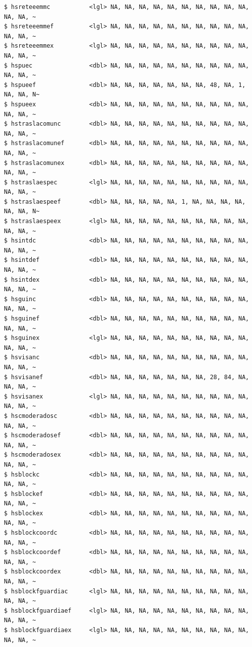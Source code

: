 \documentclass[
  letterpaper,
  DIV=11,
  numbers=noendperiod]{scrreprt}
\begin{document}
\begin{verbatim}
$ hsreteeemmc           <lgl> NA, NA, NA, NA, NA, NA, NA, NA, NA, NA, NA, NA, ~
$ hsreteeemmef          <lgl> NA, NA, NA, NA, NA, NA, NA, NA, NA, NA, NA, NA, ~
$ hsreteeemmex          <lgl> NA, NA, NA, NA, NA, NA, NA, NA, NA, NA, NA, NA, ~
$ hspuec                <dbl> NA, NA, NA, NA, NA, NA, NA, NA, NA, NA, NA, NA, ~
$ hspueef               <dbl> NA, NA, NA, NA, NA, NA, NA, 48, NA, 1, NA, NA, N~
$ hspueex               <dbl> NA, NA, NA, NA, NA, NA, NA, NA, NA, NA, NA, NA, ~
$ hstraslacomunc        <dbl> NA, NA, NA, NA, NA, NA, NA, NA, NA, NA, NA, NA, ~
$ hstraslacomunef       <dbl> NA, NA, NA, NA, NA, NA, NA, NA, NA, NA, NA, NA, ~
$ hstraslacomunex       <dbl> NA, NA, NA, NA, NA, NA, NA, NA, NA, NA, NA, NA, ~
$ hstraslaespec         <lgl> NA, NA, NA, NA, NA, NA, NA, NA, NA, NA, NA, NA, ~
$ hstraslaespeef        <dbl> NA, NA, NA, NA, NA, 1, NA, NA, NA, NA, NA, NA, N~
$ hstraslaespeex        <lgl> NA, NA, NA, NA, NA, NA, NA, NA, NA, NA, NA, NA, ~
$ hsintdc               <dbl> NA, NA, NA, NA, NA, NA, NA, NA, NA, NA, NA, NA, ~
$ hsintdef              <dbl> NA, NA, NA, NA, NA, NA, NA, NA, NA, NA, NA, NA, ~
$ hsintdex              <dbl> NA, NA, NA, NA, NA, NA, NA, NA, NA, NA, NA, NA, ~
$ hsguinc               <dbl> NA, NA, NA, NA, NA, NA, NA, NA, NA, NA, NA, NA, ~
$ hsguinef              <dbl> NA, NA, NA, NA, NA, NA, NA, NA, NA, NA, NA, NA, ~
$ hsguinex              <lgl> NA, NA, NA, NA, NA, NA, NA, NA, NA, NA, NA, NA, ~
$ hsvisanc              <dbl> NA, NA, NA, NA, NA, NA, NA, NA, NA, NA, NA, NA, ~
$ hsvisanef             <dbl> NA, NA, NA, NA, NA, NA, NA, 28, 84, NA, NA, NA, ~
$ hsvisanex             <lgl> NA, NA, NA, NA, NA, NA, NA, NA, NA, NA, NA, NA, ~
$ hscmoderadosc         <dbl> NA, NA, NA, NA, NA, NA, NA, NA, NA, NA, NA, NA, ~
$ hscmoderadosef        <dbl> NA, NA, NA, NA, NA, NA, NA, NA, NA, NA, NA, NA, ~
$ hscmoderadosex        <dbl> NA, NA, NA, NA, NA, NA, NA, NA, NA, NA, NA, NA, ~
$ hsblockc              <dbl> NA, NA, NA, NA, NA, NA, NA, NA, NA, NA, NA, NA, ~
$ hsblockef             <dbl> NA, NA, NA, NA, NA, NA, NA, NA, NA, NA, NA, NA, ~
$ hsblockex             <dbl> NA, NA, NA, NA, NA, NA, NA, NA, NA, NA, NA, NA, ~
$ hsblockcoordc         <dbl> NA, NA, NA, NA, NA, NA, NA, NA, NA, NA, NA, NA, ~
$ hsblockcoordef        <dbl> NA, NA, NA, NA, NA, NA, NA, NA, NA, NA, NA, NA, ~
$ hsblockcoordex        <dbl> NA, NA, NA, NA, NA, NA, NA, NA, NA, NA, NA, NA, ~
$ hsblockfguardiac      <lgl> NA, NA, NA, NA, NA, NA, NA, NA, NA, NA, NA, NA, ~
$ hsblockfguardiaef     <lgl> NA, NA, NA, NA, NA, NA, NA, NA, NA, NA, NA, NA, ~
$ hsblockfguardiaex     <lgl> NA, NA, NA, NA, NA, NA, NA, NA, NA, NA, NA, NA, ~

\end{verbatim}
\end{document}

